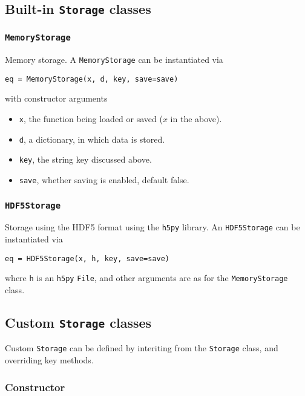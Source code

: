\documentclass[11pt]{article}
\begin{document}
\subsection{Built-in \texttt{Storage} classes}

\subsubsection{\texttt{MemoryStorage}}

Memory storage. A \texttt{MemoryStorage} can be instantiated via
\begin{lstlisting}
eq = MemoryStorage(x, d, key, save=save)
\end{lstlisting}
with constructor arguments
\begin{itemize}
  \item \texttt{x}, the function being loaded or saved ($x$ in the above).
  \item \texttt{d}, a dictionary, in which data is stored.
  \item \texttt{key}, the string key discussed above.
  \item \texttt{save}, whether saving is enabled, default false.
\end{itemize}

\subsubsection{\texttt{HDF5Storage}}

Storage using the HDF5 format \citep{hdf5} using the \texttt{h5py} library. An
\texttt{HDF5Storage} can be instantiated via
\begin{lstlisting}
eq = HDF5Storage(x, h, key, save=save)
\end{lstlisting}
where \texttt{h} is an \texttt{h5py} \texttt{File}, and other arguments are as
for the \texttt{MemoryStorage} class.

\subsection{Custom \texttt{Storage} classes}

Custom \texttt{Storage} can be defined by interiting from the \texttt{Storage}
class, and overriding key methods.

\subsubsection{Constructor}
\end{document}
